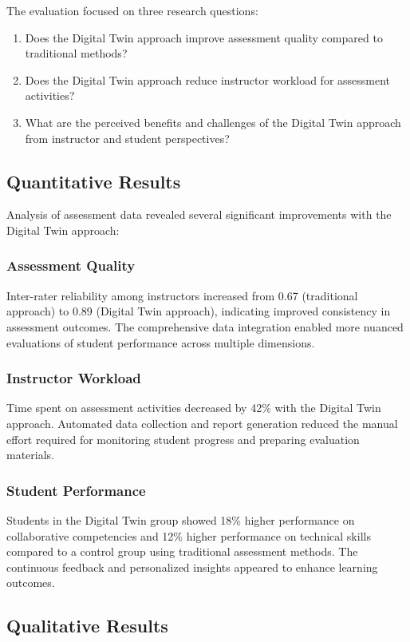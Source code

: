 \documentclass[review]{elsarticle}
\begin{document}
The evaluation focused on three research questions:
\begin{enumerate}
    \item Does the Digital Twin approach improve assessment quality compared to traditional methods?
    \item Does the Digital Twin approach reduce instructor workload for assessment activities?
    \item What are the perceived benefits and challenges of the Digital Twin approach from instructor and student perspectives?
\end{enumerate}

\subsection{Quantitative Results}
\label{sec:quantitative}

Analysis of assessment data revealed several significant improvements with the Digital Twin approach:

\subsubsection{Assessment Quality}
Inter-rater reliability among instructors increased from 0.67 (traditional approach) to 0.89 (Digital Twin approach), indicating improved consistency in assessment outcomes. The comprehensive data integration enabled more nuanced evaluations of student performance across multiple dimensions.

\subsubsection{Instructor Workload}
Time spent on assessment activities decreased by 42\% with the Digital Twin approach. Automated data collection and report generation reduced the manual effort required for monitoring student progress and preparing evaluation materials.

\subsubsection{Student Performance}
Students in the Digital Twin group showed 18\% higher performance on collaborative competencies and 12\% higher performance on technical skills compared to a control group using traditional assessment methods. The continuous feedback and personalized insights appeared to enhance learning outcomes.

\subsection{Qualitative Results}
\label{sec:qualitative}
\end{document}
